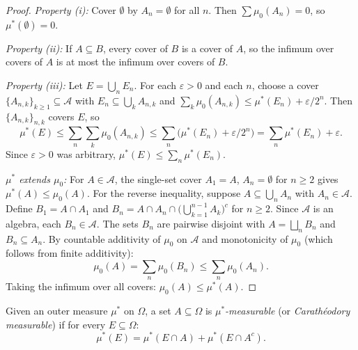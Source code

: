 \documentclass[11pt,a4paper]{article}
\begin{document}
\begin{proof}
\textit{Property (i):} Cover $\emptyset$ by $A_n = \emptyset$ for all
$n$. Then $\sum \mu_0(A_n) = 0$, so $\mu^*(\emptyset) = 0$.

\textit{Property (ii):} If $A \subseteq B$, every cover of $B$ is a
cover of $A$, so the infimum over covers of $A$ is at most the infimum
over covers of $B$.

\textit{Property (iii):} Let $E = \bigcup_n E_n$. For each
$\varepsilon > 0$ and each $n$, choose a cover
$\{A_{n,k}\}_{k \geq 1} \subseteq \mathcal{A}$ with
$E_n \subseteq \bigcup_k A_{n,k}$ and
$\sum_k \mu_0(A_{n,k}) \leq \mu^*(E_n) + \varepsilon / 2^n$. Then
$\{A_{n,k}\}_{n,k}$ covers $E$, so
\begin{equation}
  \mu^*(E) \leq \sum_n \sum_k \mu_0(A_{n,k})
    \leq \sum_n \bigl(\mu^*(E_n) + \varepsilon / 2^n\bigr)
    = \sum_n \mu^*(E_n) + \varepsilon.
\end{equation}
Since $\varepsilon > 0$ was arbitrary,
$\mu^*(E) \leq \sum_n \mu^*(E_n)$.

\textit{$\mu^*$ extends $\mu_0$:} For $A \in \mathcal{A}$, the
single-set cover $A_1 = A$, $A_n = \emptyset$ for $n \geq 2$ gives
$\mu^*(A) \leq \mu_0(A)$. For the reverse inequality, suppose
$A \subseteq \bigcup_n A_n$ with $A_n \in \mathcal{A}$. Define
$B_1 = A \cap A_1$ and $B_n = A \cap A_n \cap
\bigl(\bigcup_{k=1}^{n-1} A_k\bigr)^c$ for $n \geq 2$. Since
$\mathcal{A}$ is an algebra, each $B_n \in \mathcal{A}$. The sets
$B_n$ are pairwise disjoint with $A = \bigsqcup_n B_n$ and
$B_n \subseteq A_n$. By countable additivity of $\mu_0$ on
$\mathcal{A}$ and monotonicity of $\mu_0$ (which follows from finite
additivity):
\begin{equation}
  \mu_0(A) = \sum_n \mu_0(B_n) \leq \sum_n \mu_0(A_n).
\end{equation}
Taking the infimum over all covers: $\mu_0(A) \leq \mu^*(A)$.
\end{proof}

\begin{definition}
\label{def:cara_measurable}
Given an outer measure $\mu^*$ on $\Omega$, a set
$A \subseteq \Omega$ is \emph{$\mu^*$-measurable} (or
\emph{Carath\'{e}odory measurable}) if for every
$E \subseteq \Omega$:
\begin{equation}
  \mu^*(E) = \mu^*(E \cap A) + \mu^*(E \cap A^c).
  \label{eq:cara_condition}
\end{equation}
\end{definition}
\end{document}

